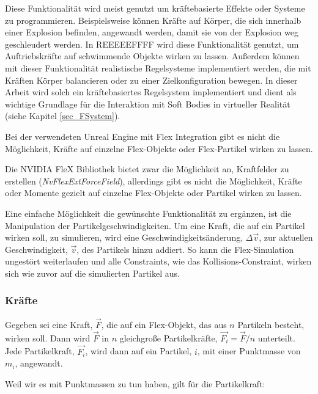 Diese Funktionalität wird meist genutzt um kräftebasierte Effekte oder Systeme zu programmieren. Beispielsweise können Kräfte auf Körper, die sich innerhalb einer Explosion befinden, angewandt werden, damit sie von der Explosion weg geschleudert werden. In REEEEEFFFF wird diese Funktionalität genutzt, um Auftriebskräfte auf schwimmende Objekte wirken zu lassen. 
Außerdem können mit dieser Funktionalität realistische Regelsysteme implementiert werden, die mit Kräften Körper balancieren oder zu einer Zielkonfiguration bewegen. In dieser Arbeit wird solch ein kräftebasiertes Regelsystem implementiert und dient als wichtige Grundlage für die Interaktion mit Soft Bodies in virtueller Realität (siehe Kapitel \ref{sec_FSystem}).

Bei der verwendeten Unreal Engine mit Flex Integration gibt es nicht die Möglichkeit, Kräfte auf einzelne Flex-Objekte oder Flex-Partikel wirken zu lassen.

Die NVIDIA FleX Bibliothek bietet zwar die Möglichkeit an, Kraftfelder zu erstellen (\textit{NvFlexExtForceField}), allerdings gibt es nicht die Möglichkeit, Kräfte oder Momente gezielt auf einzelne Flex-Objekte oder Partikel wirken zu lassen. %

Eine einfache Möglichkeit die gewünschte Funktionalität zu ergänzen, ist die Manipulation der Partikelgeschwindigkeiten. Um eine Kraft, die auf ein Partikel wirken soll, zu simulieren, wird eine Geschwindigkeitsänderung, $\Delta\vec{v}$, zur aktuellen Geschwindigkeit, $\vec{v}$, des Partikels hinzu addiert. So kann die Flex-Simulation ungestört weiterlaufen und alle Constraints, wie das Kollisions-Constraint, wirken sich wie zuvor auf die simulierten Partikel aus.

\subsubsection{Kräfte}
Gegeben sei eine Kraft, $\vec{F}$, die auf ein Flex-Objekt, das aus $n$ Partikeln besteht, wirken soll. Dann wird $\vec{F}$ in $n$ gleichgroße Partikelkräfte, $\vec{F_i} = \vec{F} / n$ unterteilt. Jede Partikelkraft, $\vec{F_i}$, wird dann auf ein Partikel, $i$, mit einer Punktmasse von $m_i$, angewandt.

Weil wir es mit Punktmassen zu tun haben, gilt für die Partikelkraft:

